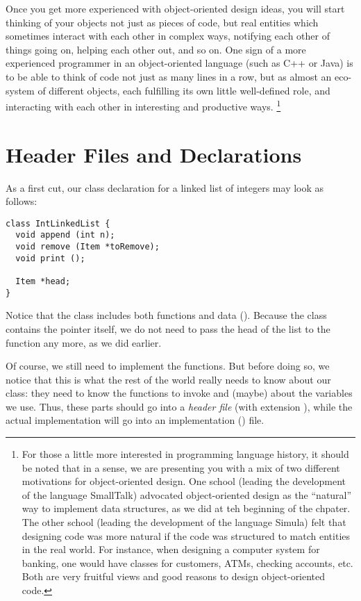 Once you get more experienced with object-oriented design ideas,
you will start thinking of your objects not just as pieces of code,
but real entities which sometimes interact with each other in complex ways,
notifying each other of things going on, helping each other out, and so on.
One sign of a more experienced programmer in an
object-oriented language (such as C++ or Java) is to be able to think
of code not just as many lines in a row, but as almost an eco-system
of different objects, each fulfilling its own little well-defined
role, and interacting with each other in interesting and productive ways.%
\footnote{For those a little more interested in programming language
  history, it should be noted that in a sense, we are presenting you
  with a mix of two different motivations for object-oriented design.
  One school (leading the development of the language SmallTalk)
  advocated object-oriented design as the ``natural'' way to implement
  data structures, as we did at teh beginning of the chpater.
  The other school (leading the development of the language Simula)
  felt that designing code was more natural if the code was structured
  to match entities in the real world. For instance, when designing a
  computer system for banking, one would have classes for customers,
  ATMs, checking accounts, etc. Both are very fruitful views and good
  reasons to design object-oriented code.}

\section{Header Files and Declarations}

As a first cut, our class declaration for a linked list of integers
may look as follows:

\begin{verbatim}
class IntLinkedList {
  void append (int n);
  void remove (Item *toRemove);
  void print ();

  Item *head;
}
\end{verbatim}

Notice that the class includes both functions and data ().
Because the class contains the pointer  itself,
we do not need to pass the head of the list to the function any more,
as we did earlier.

Of course, we still need to implement the functions.
But before doing so, we notice that this is what the rest of the
world really needs to know about our class: they need to know the
functions to invoke and (maybe) about the variables we use.
Thus, these parts should go into a \emph{header file}
(with extension ),
while the actual implementation will go into an implementation
() file.

